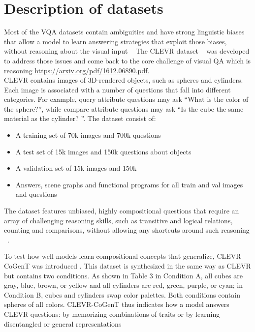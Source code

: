 \appendix

\section{Description of datasets}

Most of the VQA datasets contain ambiguities and have strong linguistic biases that allow a model to learn answering strategies that exploit those biases, without reasoning about the visual input ~\cite{Santoro2017ASN}
The CLEVR dataset ~\cite{johnson2017clevr}  was developed to address those issues and come back to the core challenge of visual QA which is reasoning  \href{url}{https://arxiv.org/pdf/1612.06890.pdf}.\\
CLEVR contains images of 3D-rendered objects, such as spheres and cylinders. Each image is associated with a number of questions that fall into different categories. For example, query attribute questions may ask “What is the color of the sphere?”, while compare attribute questions may ask “Is the cube the same material as the cylinder? ”.
The dataset consist of:
\begin{itemize}
\item 	A training set of 70k images and 700k questions
\item	A test  set of 15k images and 150k questions about objects
\item	A validation set of 15k images and 150k 
\item	Answers, scene graphs and functional programs for all train and val images and questions

\end{itemize}

The dataset features unbiased, highly compositional questions that require an array of challenging reasoning skills, such as transitive and logical relations, counting and comparisons, without allowing any shortcuts around such reasoning ~\cite{hudson2018compositional}.

To test how well models learn compositional concepts that generalize, CLEVR-CoGenT was introduced . This dataset is synthesized in the same way as CLEVR but contains two conditions. As shown in Table 3 in Condition A, all cubes are gray, blue, brown, or yellow and all cylinders are red, green, purple, or cyan; in Condition B, cubes and cylinders swap color palettes.
Both conditions contain spheres of all colors. CLEVR-CoGenT thus indicates how a model answers CLEVR questions: by memorizing combinations of traits or by learning disentangled or general representations ~\cite{perez2017film}

